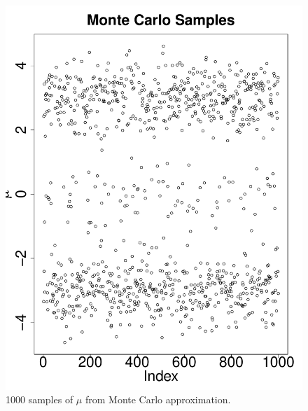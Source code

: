 \documentclass[11pt]{article}
\begin{document}
\begin{enumerate}
\begin{itemize}
\newpage
\begin{multicols}{2}
\begin{figure}[H]
\begin{center}
\includegraphics[scale=0.3]{figures/MCscatter}
\caption{\label{fig:MCscatter}1000 samples of $\mu$ from Monte Carlo approximation.}
\end{center}
\end{figure}


\end{multicols}
\end{itemize}
\end{enumerate}
\end{document}
